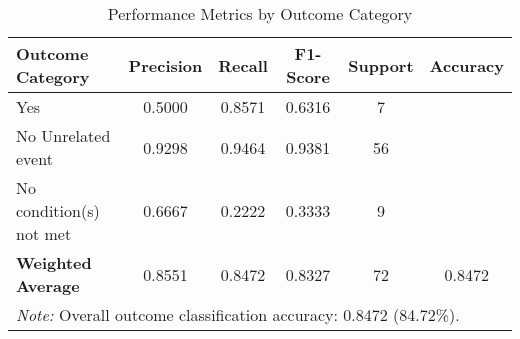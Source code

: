 \begin{table}[H]
\centering
\caption{Performance Metrics by Outcome Category}
\label{tab:classification_metrics}
\begin{tabular}{lccccc}
\toprule
\textbf{Outcome Category} & \textbf{Precision} & \textbf{Recall} & \textbf{F1-Score} & \textbf{Support} & \textbf{Accuracy} \\
\midrule
Yes & 0.5000 & 0.8571 & 0.6316 & 7 & \multirow{1}{*}{} \\
No \- Unrelated event & 0.9298 & 0.9464 & 0.9381 & 56 & \multirow{1}{*}{} \\
No \- condition(s) not met & 0.6667 & 0.2222 & 0.3333 & 9 & \multirow{1}{*}{} \\
\midrule
\textbf{Weighted Average} & 0.8551 & 0.8472 & 0.8327 & 72 & 0.8472 \\
\bottomrule
\multicolumn{6}{p{14cm}}{\textit{Note:} Overall outcome classification accuracy: 0.8472 (84.72\%).} \\
\end{tabular}
\end{table}
